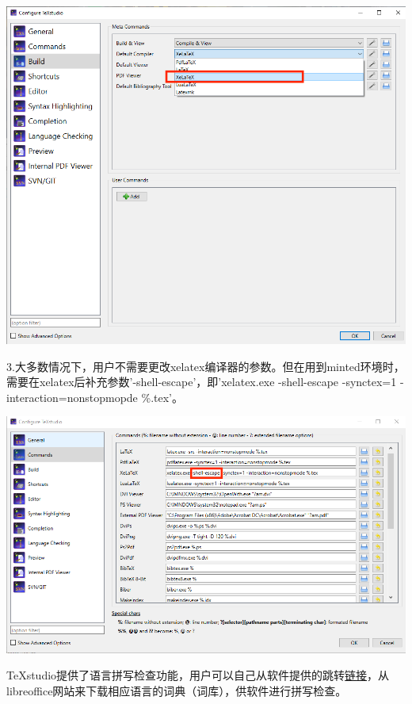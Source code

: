 \documentclass[12pt]{book}
\begin{document}
\begin{center}
     \includegraphics[scale=0.8]{./texstudio-build.png}
\end{center}
3.大多数情况下，用户不需要更改xelatex编译器的参数。但在用到minted环境时，需要在xelatex后补充参数'-shell-escape'，即'xelatex.exe -shell-escape -synctex=1 -interaction=nonstopmopde \%.tex'。


\begin{center}
     \includegraphics[scale=0.65]{./texstudio-command.png}
\end{center}
TeXstudio提供了语言拼写检查功能，用户可以自己从软件提供的跳转\href{https://extensions.libreoffice.org/}{链接}，从libreoffice网站来下载相应语言的词典（词库），供软件进行拼写检查。
\end{document}
